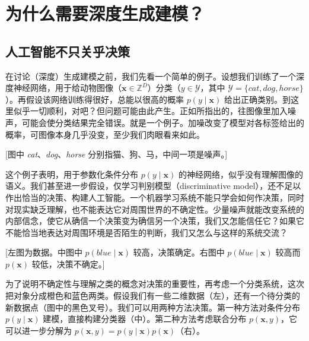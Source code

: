 \chapter{为什么需要深度生成建模？}
\label{ch:motivation}

\section{人工智能不只关乎决策}
\label{sec:decision}
在讨论（深度）生成建模之前，我们先看一个简单的例子。设想我们训练了一个深度神经网络，用于给动物图像（$\mathbf{x}\in\mathbb{Z}^{D}$）分类（$y\in\mathcal{Y}$，其中 $\mathcal{Y}=\{\mathit{cat},\mathit{dog},\mathit{horse}\}$）。再假设该网络训练得很好，总能以很高的概率 $p(y\mid\mathbf{x})$ 给出正确类别。到这里似乎一切顺利，对吧？但问题可能由此产生。正如所指出的，往图像里加入噪声，可能会使分类结果完全错误。就是一个例子。加噪改变了模型对各标签给出的概率，可图像本身几乎没变，至少我们肉眼看来如此。

[图中 \textit{cat}、\textit{dog}、\textit{horse} 分别指猫、狗、马，中间一项是噪声。]

这个例子表明，用于参数化条件分布 $p(y\mid\mathbf{x})$ 的神经网络，似乎没有理解图像的语义。我们甚至进一步假设，仅学习判别模型（discriminative model），还不足以作出恰当的决策、构建人工智能。一个机器学习系统不能只学会如何作决策，同时对现实缺乏理解，也不能表达它对周围世界的不确定性。少量噪声就能改变系统的内部信念，使它从确信一个决策变为确信另一个决策，我们又怎能信任它？如果它不能恰当地表达对周围环境是否陌生的判断，我们又怎么与这样的系统交流？

[左图为数据。中图中 $p(\mathit{blue}\mid\mathbf{x})$ 较高，决策确定。右图中 $p(\mathit{blue}\mid\mathbf{x})$ 较高而 $p(\mathbf{x})$ 较低，决策不确定。]

为了说明不确定性与理解之类的概念对决策的重要性，再考虑一个分类系统，这次把对象分成橙色和蓝色两类。假设我们有一些二维数据（左），还有一个待分类的新数据点（图中的黑色叉号）。我们可以用两种方法决策。第一种方法对条件分布 $p(y\mid\mathbf{x})$ 建模，直接构建分类器（中）。第二种方法考虑联合分布 $p(\mathbf{x},y)$，它可以进一步分解为 $p(\mathbf{x},y)=p(y\mid\mathbf{x})p(\mathbf{x})$（右）。

